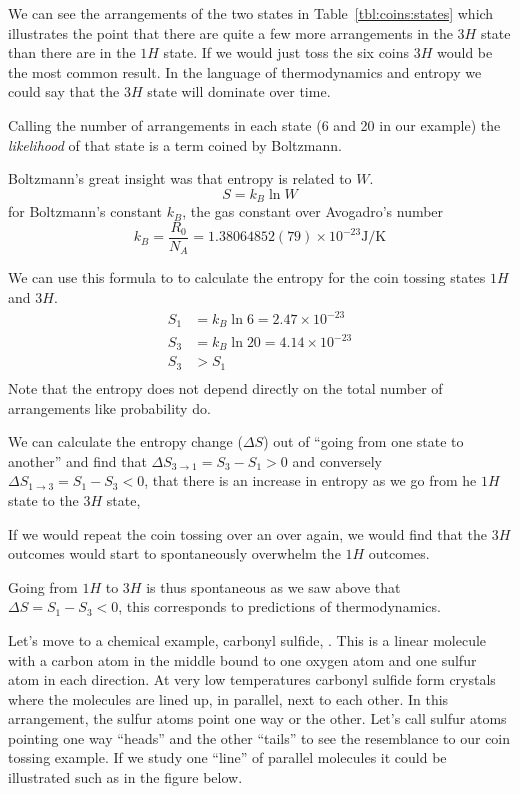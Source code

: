 \documentclass[../mit-general-chemistry.tex]{subfiles}
\begin{document}
We can see the arrangements of the two states in
Table~\ref{tbl:coins:states} which illustrates the point that there
are quite a few more arrangements in the $3H$ state than there are in
the $1H$ state. If we would just toss the six coins $3H$ would be the
most common result. In the language of thermodynamics and entropy we
could say that the $3H$ state will dominate over time.



Calling the number of arrangements in each state (6 and 20 in our
example) the {\em likelihood} of that state is a term coined by
Boltzmann.


Boltzmann's great insight was that entropy is related to $W$.
\begin{equation*}
  S = k_B \ln W
\end{equation*}
for Boltzmann's constant $k_B$, the gas constant over Avogadro's number
\begin{equation*}
  k_B = \frac{R_0}{N_A} = 1.38064852(79)\times 10^{−23} \si{\joule\per\kelvin}
\end{equation*}

We can use this formula to to calculate the entropy for the coin
tossing states $1H$ and $3H$.
\begin{align*}
  S_1 &= k_B \ln 6 = 2.47 \times 10^{-23} \\
  S_3 &= k_B \ln 20 = 4.14 \times 10^{-23} \\
  S_3 &> S_1 \\
\end{align*}
Note that the entropy does not depend directly on the total number of
arrangements like probability do.

We can calculate the entropy change ($\Delta S$) out of ``going from
one state to another'' and find that $\Delta S_{3\to 1} = S_3 - S_1 >
0$ and conversely $\Delta S_{1\to 3} = S_1 - S_3 < 0$, that there is
an increase in entropy as we go from he $1H$ state to the $3H$ state,

If we would repeat the coin tossing over an over again, we would find
that the $3H$ outcomes would start to spontaneously overwhelm the $1H$
outcomes.

Going from $1H$ to $3H$ is thus spontaneous as we saw above that
$\Delta S = S_1 - S_3 < 0$, this corresponds to predictions of
thermodynamics.




Let's move to a chemical example, carbonyl sulfide,
. This is a linear molecule with a carbon
atom in the middle bound to one oxygen atom and one sulfur atom in
each direction. At very low temperatures carbonyl sulfide form
crystals where the molecules are lined up, in parallel, next to each
other. In this arrangement, the sulfur atoms point one way or the
other. Let's call sulfur atoms pointing one way ``heads'' and the
other ``tails'' to see the resemblance to our coin tossing example. If
we study one ``line'' of parallel molecules it could be illustrated
such as in the figure below.
\end{document}

